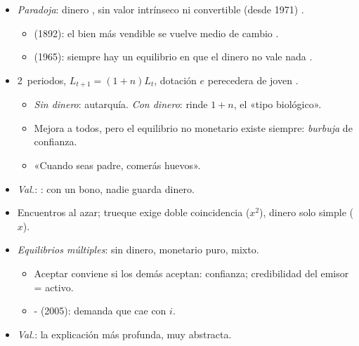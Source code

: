 \documentclass{article}
\begin{document}
\begin{columnas}
\begin{itemize}
\item \emph{Paradoja}: dinero , sin valor intrínseco ni convertible (desde 1971) .
  \begin{itemize}
  \item {} (1892): el bien más vendible se vuelve medio de cambio .
  \item {} (1965): siempre hay un equilibrio en que el dinero no vale nada .
  \end{itemize}
\end{itemize}
\begin{itemize}
\item 2~periodos, $L_{t+1}=(1+n)L_t$, dotación $e$ perecedera de joven .
  \begin{itemize}
  \item \emph{Sin dinero}: autarquía. \emph{Con dinero}: rinde $1+n$, el «tipo biológico».
  \item Mejora a todos, pero el equilibrio no monetario existe siempre: \emph{burbuja} de confianza.
  \item «Cuando seas padre, comerás huevos».
  \end{itemize}
\item \emph{Val.}: : con un bono, nadie guarda dinero.
\end{itemize}
\begin{itemize}
\item Encuentros al azar; trueque exige doble coincidencia ($x^2$), dinero solo simple ($x$).
\item \emph{Equilibrios múltiples}: sin dinero, monetario puro, mixto.
  \begin{itemize}
  \item Aceptar conviene si los demás aceptan: confianza; credibilidad del emisor = activo.
  \item {}- (2005): demanda que cae con $i$.
  \end{itemize}
\item \emph{Val.}: la explicación más profunda, muy abstracta.
\end{itemize}


\end{columnas}
\end{document}
